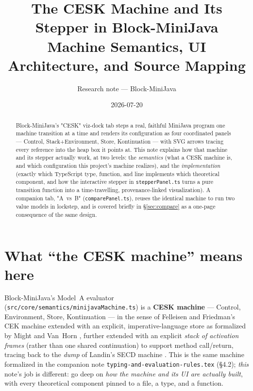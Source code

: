\documentclass[11pt]{article}
\title{The CESK Machine and Its Stepper in Block-MiniJava\\
\large Machine Semantics, UI Architecture, and Source Mapping}
\author{Research note --- Block-MiniJava}
\date{2026-07-20}
\begin{document}
\maketitle

\begin{abstract}
Block-MiniJava's "CESK" viz-dock tab steps a real, faithful MiniJava
program one machine transition at a time and renders its configuration as
four coordinated panels --- Control, Stack+Environment, Store,
Kontinuation --- with SVG arrows tracing every reference into the heap box
it points at. This note explains how that machine and its stepper actually
work, at two levels: the \emph{semantics} (what a CESK machine is, and
which configuration this project's machine realizes), and the
\emph{implementation} (exactly which TypeScript type, function, and line
implements which theoretical component, and how the interactive stepper in
\texttt{stepperPanel.ts} turns a pure transition function into a
time-travelling, provenance-linked visualization). A companion tab, "A~vs~B"
(\texttt{comparePanel.ts}), reuses the identical machine to run two value
models in lockstep, and is covered briefly in \S\ref{sec:compare} as a
one-page consequence of the same design.
\end{abstract}

\tableofcontents

\section{What ``the CESK machine'' means here}

Block-MiniJava's Model~A evaluator (\texttt{src/core/semantics/minijavaMachine.ts})
is a \textbf{CESK machine} --- Control, Environment, Store, Kontinuation ---
in the sense of Felleisen and Friedman's CEK machine
\cite{felleisen1986control} extended with an explicit, imperative-language
store as formalized by Might and Van~Horn \cite{mightvanhorn2010aam},
further extended with an explicit \emph{stack of activation frames} (rather
than one shared continuation) to support method call/return, tracing back
to the \emph{dump} of Landin's SECD machine \cite{landin1964scpp}. This is
the same machine formalized in the companion note
\texttt{typing-and-evaluation-rules.tex} (\S4.2); \emph{this} note's job is
different: go deep on \emph{how the machine and its UI are actually built},
with every theoretical component pinned to a file, a type, and a function.
\end{document}
